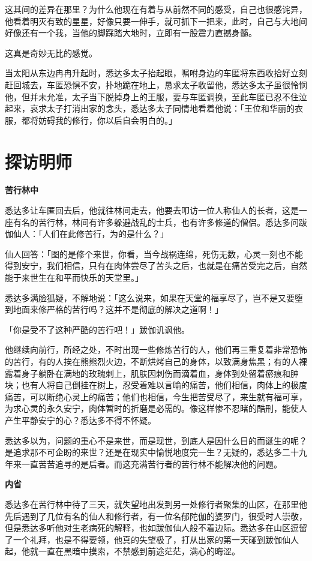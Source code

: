 \documentclass[12pt,twoside,openany]{book}
\newcommand{\mt}[1]{\textbullet \textbf{#1}}
\begin{document}
这其间的差异在那里？为什么他现在有着与从前然不同的感受，自己也很感诧异，他看着明灭有致的星星，好像只要一伸手，就可抓下一把来，此时，自己与大地间好像还有一个我，当他的脚踩踏大地时，立即有一股震力直撼身髓。

这真是奇妙无比的感觉。

当太阳从东边冉冉升起时，悉达多太子抬起眼，嘱咐身边的车匿将东西收拾好立刻赶回城去，车匿恐惧不安，扑地跪在地上，恳求太子收留他，悉达多太子虽很怜悯他，但并未允准，太子当下脱掉身上的王服，要与车匿调换，至此车匿已忍不住泣起来，哀求太子打消出家的念头，悉达多太子同情地看着他说：「王位和华丽的衣服，都将妨碍我的修行，你以后自会明白的。」

\section{探访明师}\label{sec1.2}

\mt{苦行林中}

悉达多让车匿回去后，他就往林间走去，他要去叩访一位人称仙人的长者，这是一座有名的苦行林，林间有许多躲避战乱的士兵，也有许多修道的僧侣。悉达多问跋伽仙人：「人们在此修苦行，为的是什么？」

仙人回答：「图的是修个来世，你看，当今战祸连绵，死伤无数，心灵一刻也不能得到安宁，我们相信，只有在肉体尝尽了苦头之后，也就是在痛苦受完之后，自然能于来世生在和平而快乐的天堂里。」

悉达多满脸狐疑，不解地说：「这么说来，如果在天堂的福享尽了，岂不是又要堕到地面来修严格的苦行吗？这并不是彻底的解决之道啊！」

「你是受不了这种严酷的苦行吧！」跋伽讥讽他。

他继续向前行，所经之处，不时出现一些修炼苦行的人，他们再三重复着非常恐怖的苦行，有的人挨在熊熊烈火边，不断烘烤自己的身体，以致满身焦黑；有的人裸露着身子躺卧在满地的玫瑰刺上，肌肤因刺伤而滴着血，身体到处留着瘀痕和肿块；也有人将自己倒挂在树上，忍受着难以言喻的痛苦，他们相信，肉体上的极度痛苦，可以断绝心灵上的痛苦；他们也相信，今生把苦受尽了，来生就有福可享，为求心灵的永久安宁，肉体暂时的折磨是必需的。像这样惨不忍睹的酷刑，能使人产生平静安宁的心？悉达多不得不怀疑。

悉达多以为，问题的重心不是来世，而是现世，到底人是因什么目的而诞生的呢？是追求那不可企盼的来世？还是在现实中愉悦地度完一生？无疑的，悉达多二十九年来一直苦苦追寻的是后者。而这充满苦行者的苦行林不能解决他的问题。

\mt{内省}

悉达多在苦行林中待了三天，就失望地出发到另一处修行者聚集的山区，在那里他先后遇到了几位有名的仙人和修行者，有一位名郁陀伽的婆罗门，很受时人崇敬，但是悉达多听他对生老病死的解释，也如跋伽仙人般不着边际。悉达多在山区逗留了一个礼拜，也是不得要领，他真的失望极了，打从出家的第一天碰到跋伽仙人起，他就一直在黑暗中摸索，不禁感到前途茫茫，满心的晦涩。
\end{document}

